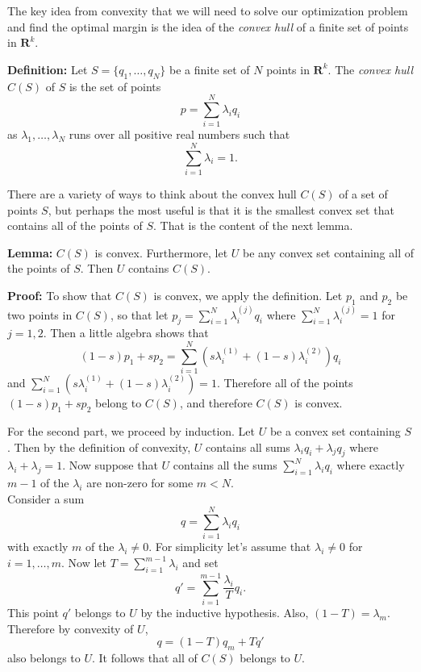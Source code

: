 \documentclass[
  11pt,
  letterpaper,
]{scrbook}
\theoremstyle{plain}
\theoremstyle{plain}
\theoremstyle{remark}
\begin{document}
The key idea from convexity that we will need to solve our optimization
problem and find the optimal margin is the idea of the \emph{convex
hull} of a finite set of points in \(\mathbf{R}^{k}\).

\textbf{Definition:} Let \(S=\{q_1,\ldots, q_{N}\}\) be a finite set of
\(N\) points in \(\mathbf{R}^{k}\). The \emph{convex hull} \(C(S)\) of
\(S\) is the set of points \[
p = \sum_{i=1}^{N} \lambda_{i}q_{i}
\] as \(\lambda_{1},\ldots,\lambda_{N}\) runs over all positive real
numbers such that \[
\sum_{i=1}^{N} \lambda_{i} = 1.
\]

There are a variety of ways to think about the convex hull \(C(S)\) of a
set of points \(S\), but perhaps the most useful is that it is the
smallest convex set that contains all of the points of \(S\). That is
the content of the next lemma.

\textbf{Lemma:} \(C(S)\) is convex. Furthermore, let \(U\) be any convex
set containing all of the points of \(S\). Then \(U\) contains \(C(S)\).

\textbf{Proof:} To show that \(C(S)\) is convex, we apply the
definition. Let \(p_1\) and \(p_2\) be two points in \(C(S)\), so that
let \(p_{j}=\sum_{i=1}^{N} \lambda^{(j)}_{i}q_{i}\) where
\(\sum_{i=1}^{N}\lambda^{(j)}_{i} = 1\) for \(j=1,2\). Then a little
algebra shows that \[
(1-s)p_1+sp_{2} = \sum_{i=1}^{N} (s\lambda^{(1)}_{i}+(1-s)\lambda^{(2)}_{i})q_{i}
\] and
\(\sum_{i=1}^{N} (s\lambda^{(1)}_{i}+(1-s)\lambda^{(2)}_{i}) = 1\).
Therefore all of the points \((1-s)p_{1}+sp_{2}\) belong to \(C(S)\),
and therefore \(C(S)\) is convex.

For the second part, we proceed by induction. Let \(U\) be a convex set
containing \(S\). Then by the definition of convexity, \(U\) contains
all sums \(\lambda_{i}q_{i}+\lambda_{j}q_{j}\) where
\(\lambda_i+\lambda_j=1\). Now suppose that \(U\) contains all the sums
\(\sum_{i=1}^{N} \lambda_{i}q_{i}\) where exactly \(m-1\) of the
\(\lambda_{i}\) are non-zero for some \(m<N\).\\
Consider a sum \[
q = \sum_{i=1}^{N}\lambda_{i}q_{i}
\] with exactly \(m\) of the \(\lambda_{i}\not=0\). For simplicity let's
assume that \(\lambda_{i}\not=0\) for \(i=1,\ldots, m\). Now let
\(T=\sum_{i=1}^{m-1}\lambda_{i}\) and set \[
q' = \sum_{i=1}^{m-1}\frac{\lambda_{i}}{T}q_{i}.
\] This point \(q'\) belongs to \(U\) by the inductive hypothesis. Also,
\((1-T)=\lambda_{m}\). Therefore by convexity of \(U\), \[
q = (1-T)q_{m}+Tq'
\] also belongs to \(U\). It follows that all of \(C(S)\) belongs to
\(U\).
\end{document}
